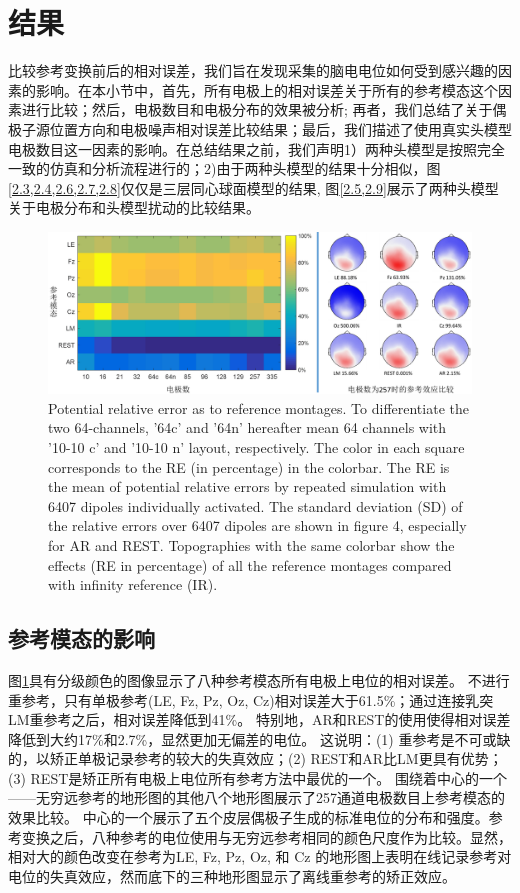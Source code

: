\section{结果}
比较参考变换前后的相对误差，我们旨在发现采集的脑电电位如何受到感兴趣的因素的影响。在本小节中，首先，所有电极上的相对误差关于所有的参考模态这个因素进行比较；然后，电极数目和电极分布的效果被分析; 再者，我们总结了关于偶极子源位置方向和电极噪声相对误差比较结果；最后，我们描述了使用真实头模型电极数目这一因素的影响。在总结结果之前，我们声明1）两种头模型是按照完全一致的仿真和分析流程进行的；2)由于两种头模型的结果十分相似，图\cref{2.3,2.4,2.6,2.7,2.8}仅仅是三层同心球面模型的结果, 图\cref{2.5,2.9}展示了两种头模型关于电极分布和头模型扰动的比较结果。
\begin{figure}[h!]
	\centering
	\includegraphics[width=15cm]{pic/JNE/figure3.png}
	\caption{Potential relative error as to reference montages. To differentiate the two 64-channels, '64c' and '64n' hereafter mean 64 channels with '10-10 c' and '10-10 n' layout, respectively. The color in each square corresponds to the RE (in percentage) in the colorbar. The RE is the mean of potential relative errors by repeated simulation with 6407 dipoles individually activated. The standard deviation (SD) of the relative errors over 6407 dipoles are shown in figure 4, especially for AR and REST. Topographies with the same colorbar show the effects (RE in percentage) of all the reference montages compared with infinity reference (IR).}
	\label{2.3}
\end{figure}
\subsection{参考模态的影响}
图\ref{2.3}具有分级颜色的图像显示了八种参考模态所有电极上电位的相对误差。 不进行重参考，只有单极参考(LE, Fz, Pz, Oz, Cz)相对误差大于61.5\%；通过连接乳突LM重参考之后，相对误差降低到41\%。 特别地，AR和REST的使用使得相对误差降低到大约17\%和2.7\%，显然更加无偏差的电位。 这说明：(1) 重参考是不可或缺的，以矫正单极记录参考的较大的失真效应；(2) REST和AR比LM更具有优势；(3) REST是矫正所有电极上电位所有参考方法中最优的一个。 围绕着中心的一个——无穷远参考的地形图的其他八个地形图展示了257通道电极数目上参考模态的效果比较。 中心的一个展示了五个皮层偶极子生成的标准电位的分布和强度。参考变换之后，八种参考的电位使用与无穷远参考相同的颜色尺度作为比较。显然，相对大的颜色改变在参考为LE, Fz, Pz, Oz, 和 Cz 的地形图上表明在线记录参考对电位的失真效应，然而底下的三种地形图显示了离线重参考的矫正效应。
